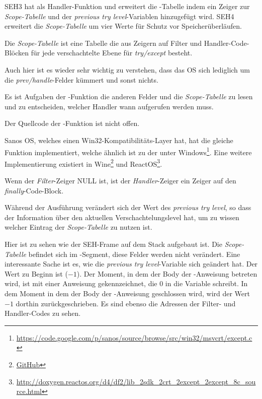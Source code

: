 
SEH3 hat  als Handler-Funktion und erweitert die
-Tabelle indem ein Zeiger zur \emph{Scope-Tabelle} und
der \emph{previous try level}-Variablen hinzugefügt wird.
SEH4 erweitert die \emph{Scope-Tabelle} um vier Werte für Schutz vor Speicherüberläufen.

Die \emph{Scope-Tabelle} ist eine Tabelle die aus Zeigern auf Filter und Handler-Code-Blöcken
für jede verschachtelte Ebene für \emph{try/except} besteht.



Auch hier ist es wieder sehr wichtig zu verstehen, dass das \ac{OS} sich lediglich
um die \emph{prev/handle}-Felder kümmert und sonst nichts.

Es ist Aufgaben der -Funktion die anderen Felder und die
\emph{Scope-Tabelle} zu lesen und zu entscheiden, welcher Handler wann aufgerufen
werden muss.

Der Quellcode der -Funktion ist nicht offen.

Sanos OS, welches einen Win32-Kompatibilitäts-Layer hat, hat die gleiche Funktion
implementiert, welche ähnlich ist zu der unter Windows\footnote{\url{https://code.google.com/p/sanos/source/browse/src/win32/msvcrt/except.c}}.
Eine weitere Implementierung existiert in Wine\footnote{\href{https://github.com/mirrors/wine/blob/master/dlls/msvcrt/except_i386.c}{GitHub}}
und ReactOS\footnote{\url{http://doxygen.reactos.org/d4/df2/lib_2sdk_2crt_2except_2except_8c_source.html}}.

Wenn der \emph{Filter}-Zeiger NULL ist, ist der \emph{Handler}-Zeiger ein Zeiger auf
den \emph{finally}-Code-Block.

Während der Ausführung verändert sich der Wert des \emph{previous try level}, so dass
der  Information über den aktuellen Verschachtelungslevel
hat, um zu wissen welcher Eintrag der \emph{Scope-Tabelle} zu nutzen ist.






Hier ist zu sehen wie der SEH-Frame auf dem Stack aufgebaut ist.
Die \emph{Scope-Tabelle} befindet sich im -Segment, diese Felder werden
nicht verändert.
Eine interessante Sache ist es, wie die \emph{previous try level}-Variable sich geändert hat.
Der Wert zu Beginn ist  ($-1$).
Der Moment, in dem der Body der -Anweisung betreten wird, ist mit einer Anweisung
gekennzeichnet, die 0 in die Variable schreibt.
In dem Moment in dem der Body der -Anweisung geschlossen wird, wird der Wert $-1$
dorthin zurückgeschrieben.
Es sind ebenso die Adressen der Filter- und Handler-Codes zu sehen.

